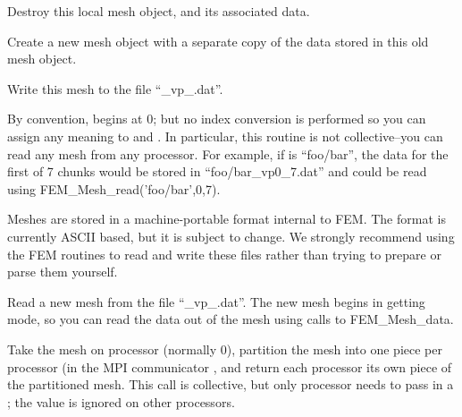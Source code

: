 Destroy this local mesh object, and its associated
data.



Create a new mesh object with a separate copy of the data 
stored in this old mesh object.



Write this mesh to the file ``\_vp\_.dat''.

By convention,  begins at 0; but no index conversion is
performed so you can assign any meaning to  and .
In particular, this routine is not collective--you can read any
mesh from any processor.
For example, if  is ``foo/bar'', the data for the 
first of 7 chunks would be stored in ``foo/bar\_vp0\_7.dat''
and could be read using FEM\_Mesh\_read('foo/bar',0,7).

Meshes are stored in a machine-portable format internal to FEM.
The format is currently ASCII based, but it is subject to change.
We strongly recommend using the FEM routines to read and write 
these files rather than trying to prepare or parse them yourself.



Read a new mesh from the file ``\_vp\_.dat''.
The new mesh begins in getting mode, so you can read the 
data out of the mesh using calls to FEM\_Mesh\_data.




Take the mesh  on processor  (normally 0), 
partition the mesh into one piece per processor (in the MPI communicator
, and return each processor its own piece 
of the partitioned mesh.  This call is collective, but only 
processor  needs to pass in a ; the 
 value is ignored on other processors.

